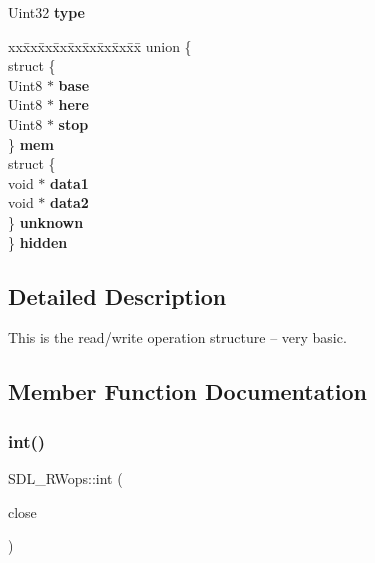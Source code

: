 \begin{DoxyCompactItemize}
\item 
\mbox{\label{struct_s_d_l___r_wops_a099017bfceaac24ced0e4d08a4e0a023}} 
Uint32 {\bfseries type}
\item 
\mbox{\label{struct_s_d_l___r_wops_a2bf0dec0395f771b30c841fc7296164b}} 
\begin{tabbing}
xx\=xx\=xx\=xx\=xx\=xx\=xx\=xx\=xx\=\kill
union \{\\
\>struct \{\\
\>\>Uint8 $\ast$ {\bfseries base}\\
\>\>Uint8 $\ast$ {\bfseries here}\\
\>\>Uint8 $\ast$ {\bfseries stop}\\
\>\} {\bfseries mem}\\
\>struct \{\\
\>\>void $\ast$ {\bfseries data1}\\
\>\>void $\ast$ {\bfseries data2}\\
\>\} {\bfseries unknown}\\
\} {\bfseries hidden}\\

\end{tabbing}\end{DoxyCompactItemize}


\subsection{Detailed Description}
This is the read/write operation structure -- very basic. 

\subsection{Member Function Documentation}
\mbox{\label{struct_s_d_l___r_wops_ab303bcbb0f6742a141ba8b2998923f47}} 
\subsubsection{\texorpdfstring{int()}{int()}}
{\footnotesize\ttfamily S\+D\+L\+\_\+\+R\+Wops\+::int (\begin{DoxyParamCaption}\item[{S\+D\+L\+C\+A\+LL $\ast$}]{close }\end{DoxyParamCaption})}

